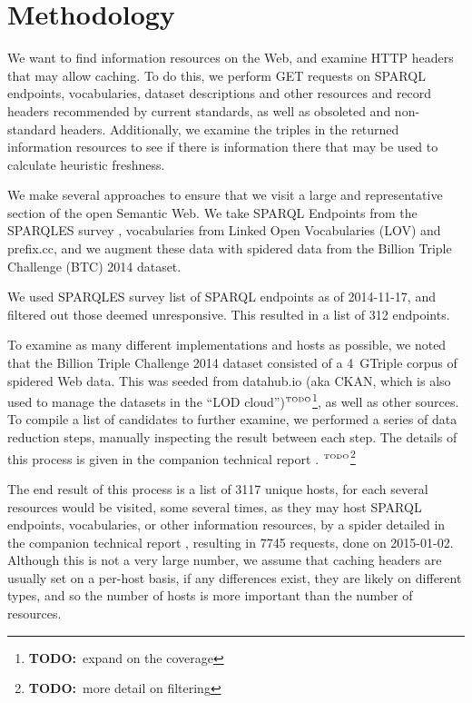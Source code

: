 \documentclass{llncs}
\newcommand{\todo}[1]{\ensuremath{^{\textrm{\tiny{TODO}\normalsize}}}\footnote{\textbf{TODO:}~#1}}
\begin{document}
\section{Methodology}
We want to find information resources on the Web, and examine HTTP
headers that may allow caching. To do this, we perform GET requests on
SPARQL endpoints, vocabularies, dataset descriptions and other
resources and record headers recommended by current standards, as well
as obsoleted and non-standard headers. Additionally, we examine the
triples in the returned information resources to see if there is
information there that may be used to calculate heuristic freshness.

We make several approaches to ensure that we visit a large and
representative section of the open Semantic Web. We take SPARQL
Endpoints from the SPARQLES survey \cite{buil2013sparql}, vocabularies
from Linked Open Vocabularies (LOV) \cite{lov2} and prefix.cc, and
we augment these data with spidered data from the Billion Triple
Challenge (BTC) 2014 \cite{btc-2014} dataset.

We used SPARQLES survey list of SPARQL endpoints as of 2014-11-17, and
filtered out those deemed unresponsive. This resulted in a
list of 312 endpoints.

To examine as many different implementations and hosts as possible, we
noted that the Billion Triple Challenge 2014 \cite{btc-2014} dataset
consisted of a 4~GTriple corpus of spidered Web data. This was seeded
from datahub.io (aka CKAN, which is also used to manage the datasets
in the ``LOD cloud'')\todo{expand on the coverage}, as well as other sources. To compile a list of
candidates to further examine, we performed a series of data reduction
steps, manually inspecting the result between each step. The details
of this process is given in the companion technical report
\cite{kjernsmo_add_survey_2015}.%
\todo{more detail on filtering}

The end result of this process is a list of 3117 unique hosts, for
each several resources would be visited, some several times, as they
may host SPARQL endpoints, vocabularies, or other information
resources, by a spider detailed in the companion technical report
\cite{kjernsmo_add_survey_2015}, resulting in 7745 requests, done on
2015-01-02. Although this is not a very large number, we assume that
caching headers are usually set on a per-host basis, if any
differences exist, they are likely on different types, and so the
number of hosts is more important than the number of resources.
\end{document}
